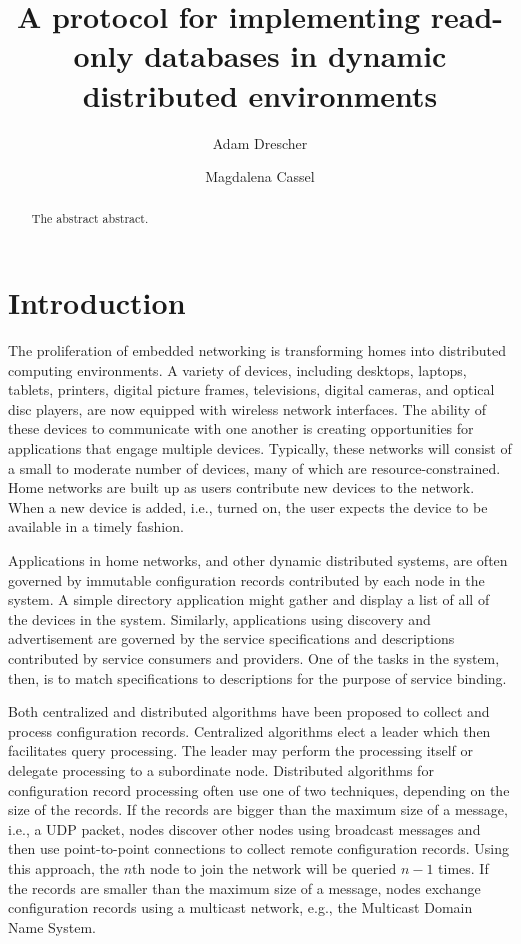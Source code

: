 \documentclass[letterpaper]{article}
\begin{document}
\title{A protocol for implementing read-only databases in dynamic distributed environments}
\author{Adam Drescher \and Magdalena Cassel}
\date{}

\maketitle

\begin{abstract}
The abstract abstract.
\end{abstract}

\section{Introduction}
The proliferation of embedded networking is transforming homes into distributed computing environments.
A variety of devices, including desktops, laptops, tablets, printers, digital picture frames, televisions, digital cameras, and optical disc players, are now equipped with wireless network interfaces.
The ability of these devices to communicate with one another is creating opportunities for applications that engage multiple devices.
Typically, these networks will consist of a small to moderate number of devices, many of which are resource-constrained.
Home networks are built up as users contribute new devices to the network.
When a new device is added, i.e., turned on, the user expects the device to be available in a timely fashion.

Applications in home networks, and other dynamic distributed systems, are often governed by immutable configuration records contributed by each node in the system.
A simple directory application might gather and display a list of all of the devices in the system.
Similarly, applications using discovery and advertisement are governed by the service specifications and descriptions contributed by service consumers and providers.
One of the tasks in the system, then, is to match specifications to descriptions for the purpose of service binding.

Both centralized and distributed algorithms have been proposed to collect and process configuration records.
Centralized algorithms elect a leader which then facilitates query processing.
The leader may perform the processing itself or delegate processing to a subordinate node.
Distributed algorithms for configuration record processing often use one of two techniques, depending on the size of the records.
If the records are bigger than the maximum size of a message, i.e., a UDP packet, nodes discover other nodes using broadcast messages and then use point-to-point connections to collect remote configuration records.
Using this approach, the $n$th node to join the network will be queried $n-1$ times.
If the records are smaller than the maximum size of a message, nodes exchange configuration records using a multicast network, e.g., the Multicast Domain Name System.
\end{document}
